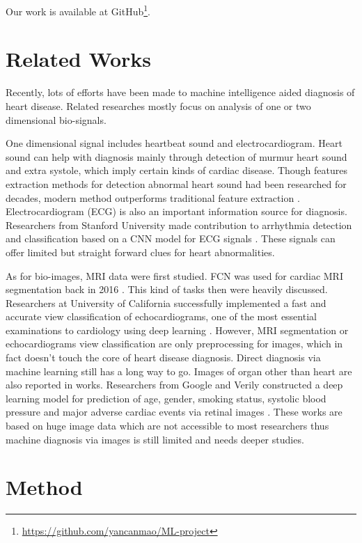 \documentclass[letterpaper]{article} %
\begin{document}
Our work is available at GitHub\footnote{\url{https://github.com/yancanmao/ML-project}}.

\section{Related Works}

Recently, lots of efforts have been made to machine intelligence aided diagnosis of heart disease. Related researches mostly focus on analysis of one or two dimensional bio-signals. 

One dimensional signal includes heartbeat sound and electrocardiogram. Heart sound can help with diagnosis mainly through detection of murmur heart sound and extra systole, which imply certain kinds of cardiac disease. Though features extraction methods for detection abnormal heart sound had been researched for decades, modern method outperforms traditional feature extraction \cite{chen2017s1}. Electrocardiogram (ECG) is also an important information source for diagnosis. Researchers from Stanford University made contribution to arrhythmia detection and classification based on a CNN model for ECG signals \cite{rajpurkar2017cardiologist}. These signals can offer limited but straight forward clues for heart abnormalities. 

As for bio-images, MRI data were first studied. FCN was used for cardiac MRI segmentation back in 2016 \cite{tran2016fully}. This kind of tasks then were heavily discussed. Researchers at University of California successfully implemented a fast and accurate view classification of echocardiograms, one of the most essential examinations to cardiology using deep learning \cite{madani2018fast}. However, MRI segmentation or echocardiograms view classification are only preprocessing for images, which in fact doesn’t touch the core of heart disease diagnosis. Direct diagnosis via machine learning still has a long way to go. Images of organ other than heart are also reported in works. Researchers from Google and Verily constructed a deep learning model for prediction of age, gender, smoking status, systolic blood pressure and major adverse cardiac events via retinal images \cite{poplin2018prediction}. These works are based on huge image data which are not accessible to most researchers thus machine diagnosis via images is still limited and needs deeper studies.

\section{Method}
\end{document}
